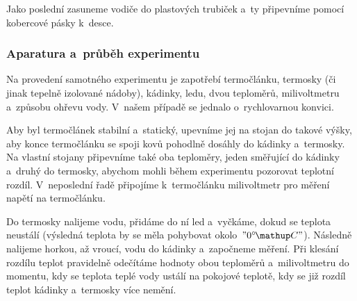 Jako poslední zasuneme vodiče do plastových trubiček a~ty připevníme
pomocí kobercové pásky k~desce.

\subsubsection{Aparatura a~průběh experimentu}
Na provedení samotného experimentu je zapotřebí termočlánku, termosky (či jinak
tepelně izolované nádoby), kádinky, ledu, dvou teploměrů, milivoltmetru
a~způsobu ohřevu vody. V~našem případě se jednalo o~rychlovarnou konvici.

Aby byl termočlánek stabilní a~statický, upevníme jej na stojan do takové
výšky, aby konce termočlánku se spoji kovů pohodlně dosáhly do kádinky
a~termosky. Na vlastní stojany připevníme také oba teploměry, jeden
směřující do kádinky a~druhý do termosky, abychom mohli během experimentu
pozorovat teplotní rozdíl. V~neposlední řadě připojíme k~termočlánku
milivoltmetr pro měření napětí na termočlánku. 

Do termosky nalijeme vodu, přidáme do ní led a~vyčkáme, dokud se teplota
neustálí (výsledná teplota by se měla pohybovat okolo~$"0 \C"$). Následně
nalijeme horkou, až vroucí, vodu do kádinky a~započneme měření. Při klesání
rozdílu teplot pravidelně odečítáme hodnoty obou teploměrů a~milivoltmetru
do momentu, kdy se teplota teplé vody ustálí na pokojové teplotě, kdy se
již rozdíl teplot kádinky a~termosky více nemění.
